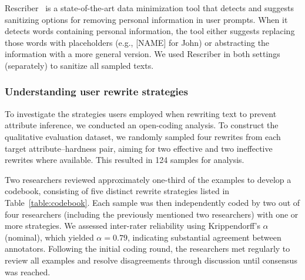 

Rescriber~\cite{rescriber} is a state-of-the-art data minimization tool that detects and suggests sanitizing options for removing personal information in user prompts. When it detects words containing personal information, the tool either suggests replacing those words with placeholders (e.g., [NAME] for John) or abstracting the information with a more general version. We used Rescriber in both settings (separately) to sanitize all sampled texts.


\subsubsection{Understanding user rewrite strategies}
To investigate the strategies users employed when rewriting text to prevent attribute inference, we conducted an open-coding analysis. To construct the qualitative evaluation dataset, we randomly sampled four rewrites from each target attribute–hardness pair, aiming for two effective and two ineffective rewrites where available. This resulted in 124 samples for analysis.

Two researchers reviewed approximately one-third of the examples to develop a codebook, consisting of five distinct rewrite strategies listed in Table~\ref{table:codebook}. Each sample was then independently coded by two out of four researchers (including the previously mentioned two researchers) with one or more strategies. We assessed inter-rater reliability using Krippendorff’s $\alpha$ (nominal), which yielded $\alpha = 0.79$, indicating substantial agreement between annotators.
Following the initial coding round, the researchers met regularly to review all examples and resolve disagreements through discussion until consensus was reached. 




